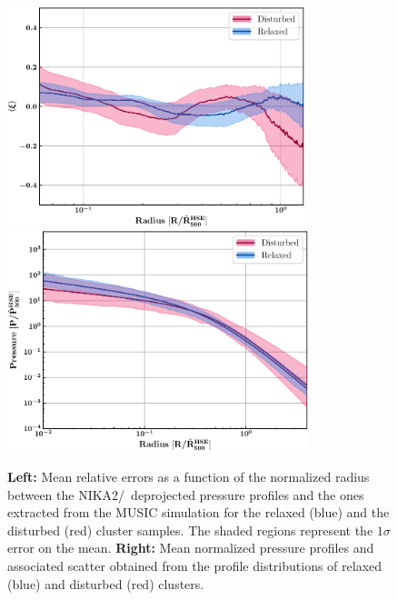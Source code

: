 \documentclass[twocolumn,traditabstract]{aa}
\begin{document}
\begin{figure}[h!]
\centering
\includegraphics[height=6.4cm]{Estimation_error.pdf}
\hspace{0.6cm}
\includegraphics[height=6.4cm]{NIKA2_universals.pdf}
\caption{{\footnotesize \textbf{Left:} Mean relative errors as a function of the normalized radius between the NIKA2/\planck\ deprojected pressure profiles and the ones extracted from the MUSIC simulation for the relaxed (blue) and the disturbed (red) cluster samples. The shaded regions represent the $1\sigma$ error on the mean. \textbf{Right:} Mean normalized pressure profiles and associated scatter obtained from the profile distributions of relaxed (blue) and disturbed (red) clusters.}}
\label{fig:mean_pressure_prof}
\end{figure}
\end{document}
